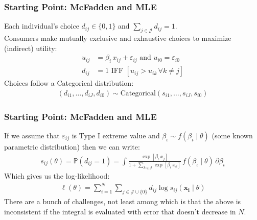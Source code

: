 \begin{frame}
\frametitle{Starting Point: McFadden and MLE}
Each individual's choice $d_{ij} \in\{0,1\}$ and $\sum_{j \in \mathcal{J}} d_{ij} =1$.\\
Consumers make mutually exclusive and exhaustive choices to maximize (indirect) utility:
\begin{align*}
u_{ij} &= \beta_i \, x_{ij}  + \varepsilon_{ij} \text{ and }
u_{i0} = \varepsilon_{i0}\\
d_{ij} &=1 \text{ IFF } [u_{ij} > u_{ik}\, \forall k \neq j]
\end{align*}
Choices follow a Categorical distribution:
\begin{align*}
(d_{i1},\ldots,d_{iJ},d_{i0}) \sim \text{Categorical} (s_{i1},\ldots,s_{iJ},s_{i0} ) 
\end{align*}
\end{frame}


\begin{frame}
\frametitle{Starting Point: McFadden and MLE}
If we assume that $\varepsilon_{ij}$ is Type I extreme value and $\beta_{\iota} \sim f(\beta_{\iota} \mid \theta)$ (some known parametric distribution) then we can write:
\begin{align*}
s_{ij}(\theta)= \mathbb{P}(d_{ij}=1) = \int \frac{\exp[\beta_{\iota} \, x_j]}{1+\sum_{k \in \mathcal{J}} \exp[\beta_{\iota} \, x_k]}\, f(\beta_{\iota} \mid \theta)\, \partial \beta_{\iota}
\end{align*}
Which gives us the log-likelihood:
 \begin{align*}
 \ell(\theta) = \sum_{i=1}^N \sum_{j \in \mathcal{J} \cup \{0\}} d_{ij} \log s_{ij}(\mathbf{x_i} \mid \theta)
 \end{align*}
 There are a bunch of challenges, not least among which is that the above is \alert{inconsistent} if the integral is evaluated with error that doesn't decrease in $N$.
\end{frame}







